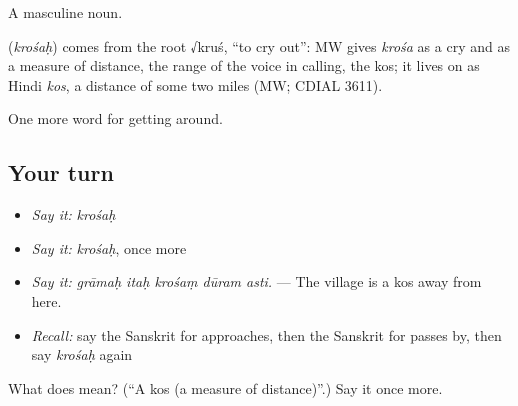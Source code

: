 A masculine noun.

\begin{cousinweb}
\textbf{} (\emph{krośaḥ}) comes from the root √kruś, \textquotedblleft{}to cry out\textquotedblright{}: MW gives \emph{krośa} as a cry and as a measure of distance, the range of the voice in calling, the kos; it lives on as Hindi \emph{kos}, a distance of some two miles (MW; CDIAL 3611).
\end{cousinweb}

\begin{grammarlens}[title={What you've built}]
One more word for getting around.
\end{grammarlens}

\subsection*{Your turn}
\begin{itemize}
\raggedright
  \item \emph{Say it:} \emph{krośaḥ}
  \item \emph{Say it:} \emph{krośaḥ}, once more
  \item \emph{Say it:} \emph{grāmaḥ itaḥ krośaṃ dūram asti.} — The village is a kos away from here.
  \item \emph{Recall:} say the Sanskrit for approaches, then the Sanskrit for passes by, then say \emph{krośaḥ} again
\end{itemize}

\begin{tcolorbox}[breakable,colback=teal!4,colframe=teal!35!black,title={Before you move on}]
What does  mean? (\textquotedblleft{}A kos (a measure of distance)\textquotedblright{}.) Say it once more.
\end{tcolorbox}
